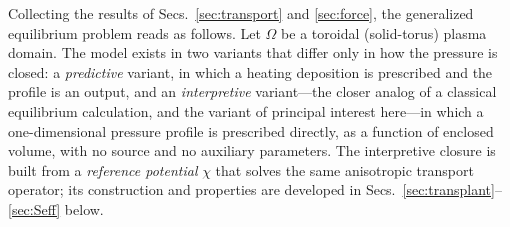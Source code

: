 \documentclass[english]{article}
\begin{document}
Collecting the results of Secs.~\ref{sec:transport} and \ref{sec:force}, the generalized
equilibrium problem reads as follows. Let $\Omega$ be a toroidal (solid-torus) plasma domain. The
model exists in two variants that differ only in how the pressure is closed: a \emph{predictive}
variant, in which a heating deposition is prescribed and the profile is an output, and an
\emph{interpretive} variant---the closer analog of a classical equilibrium calculation, and the
variant of principal interest here---in which a one-dimensional pressure profile is prescribed
directly, as a function of enclosed volume, with no source and no auxiliary parameters. The
interpretive closure is built from a \emph{reference potential} $\chi$ that solves the same
anisotropic transport operator; its construction and properties are developed in
Secs.~\ref{sec:transplant}--\ref{sec:Seff} below.
\end{document}
